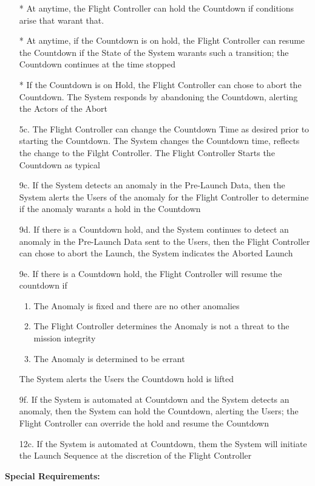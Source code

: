 \documentclass[letterpaper]{article}
\begin{document}
\begin{itemize}
\item[*]  At anytime, the Flight Controller can hold the Countdown
if conditions arise that warant that.
\item[*] At anytime, if the Countdown is on hold, the Flight
Controller can resume the Countdown if the State of the System warants
such a transition;  the Countdown continues at the time stopped
\item[*] If the Countdown is on Hold, the Flight Controller can chose
to
abort the Countdown.  The System responds by abandoning the Countdown,
alerting the Actors of the Abort
\item[5c.] The Flight Controller can change the Countdown Time as
desired prior to starting the Countdown.  The System changes the
Countdown time, reflects the change to the Filght Controller.  The
Flight Controller Starts the Countdown as typical
\item[9c.]  If the System detects an anomaly in the
Pre-Launch Data, then the System alerts the Users of the anomaly for
the Flight Controller to determine if the anomaly warants a hold in
the
Countdown
\item[9d.]  If there is a Countdown hold, and the System continues to
detect an anomaly in the Pre-Launch Data sent to the Users, then the
Flight Controller can chose to abort the Launch, the System indicates
the Aborted Launch
\item[9e.]  If there is a Countdown hold, the Flight Controller will
resume the countdown if
\begin{enumerate}
\item The Anomaly is fixed and there are no other anomalies
\item The Flight Controller determines the Anomaly is not a threat
to the mission integrity
\item The Anomaly is determined to be errant
\end{enumerate}
The System alerts the Users the Countdown hold is lifted
\item[9f.] If the System is automated at Countdown and the System
detects an anomaly, then the System can hold the Countdown, alerting
the Users;  the Flight Controller can override the hold and resume the
Countdown
\item[12c.] If the System is automated at Countdown, them the System
will initiate the Launch Sequence at the discretion of the Flight
Controller
\end{itemize}
\textbf{Special Requirements: }
\end{document}
